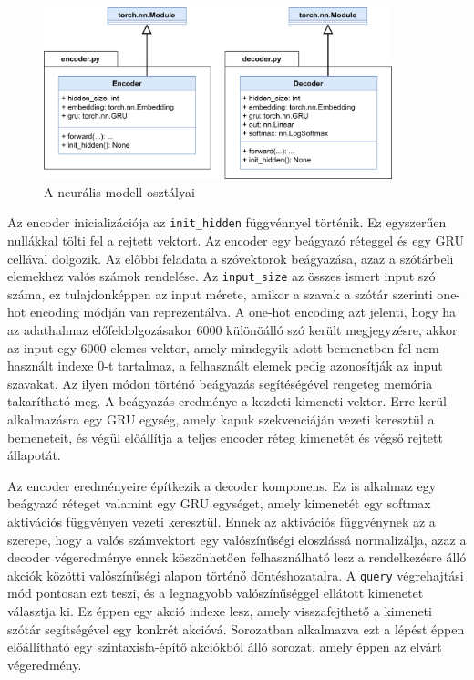 \documentclass[twoside, 12pt]{report}
\newcommand{\graphicswidth}{0.9\textwidth}
\begin{document}
\begin{figure}[H]
  \centering
  \includegraphics[width=\graphicswidth]{osztaly-diagram-modell.png}
  \caption{A neurális modell osztályai}
\end{figure}

Az encoder inicializációja az \verb|init_hidden| függvénnyel történik. Ez egyszerűen nullákkal tölti fel a rejtett vektort. Az encoder egy beágyazó réteggel és egy GRU cellával dolgozik. Az előbbi feladata a szóvektorok beágyazása, azaz a szótárbeli elemekhez valós számok rendelése. Az \verb|input_size| az összes ismert input szó száma, ez tulajdonképpen az input mérete, amikor a szavak a szótár szerinti one-hot encoding módján van reprezentálva. A one-hot encoding azt jelenti, hogy ha az adathalmaz előfeldolgozásakor 6000 különöálló szó került megjegyzésre, akkor az input egy 6000 elemes vektor, amely mindegyik adott bemenetben fel nem használt indexe 0-t tartalmaz, a felhasznált elemek pedig azonosítják az input szavakat. Az ilyen módon történő beágyazás segítéségével rengeteg memória takarítható meg. A beágyazás eredménye a kezdeti kimeneti vektor. Erre kerül alkalmazásra egy GRU egység, amely kapuk szekvenciáján vezeti keresztül a bemeneteit, és végül előállítja a teljes encoder réteg kimenetét és végső rejtett állapotát.

Az encoder eredményeire építkezik a decoder komponens. Ez is alkalmaz egy beágyazó réteget valamint egy GRU egységet, amely kimenetét egy softmax aktivációs függvényen vezeti keresztül. Ennek az aktivációs függvénynek az a szerepe, hogy a valós számvektort egy valószínűségi eloszlássá normalizálja, azaz a decoder végeredménye ennek köszönhetően felhasználható lesz a rendelkezésre álló akciók közötti valószínűségi alapon történő döntéshozatalra. A \verb|query| végrehajtási mód pontosan ezt teszi, és a legnagyobb valószínűséggel ellátott kimenetet választja ki. Ez éppen egy akció indexe lesz, amely visszafejthető a kimeneti szótár segítségével egy konkrét akcióvá. Sorozatban alkalmazva ezt a lépést éppen előállítható egy szintaxisfa-építő akciókból álló sorozat, amely éppen az elvárt végeredmény.
\end{document}
